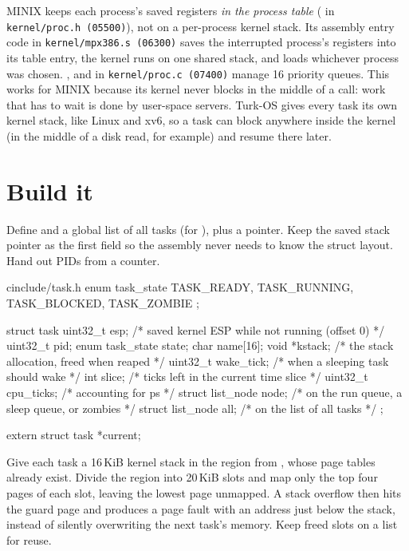 \documentclass[11pt,a4paper]{article}
\begin{document}
\begin{minixbox}
MINIX keeps each process's saved registers \emph{in the process table} ( in \texttt{kernel/proc.h
(05500)}), not on a per-process kernel stack. Its assembly entry code in \texttt{kernel/mpx386.s (06300)} saves the
interrupted process's registers into its table entry, the kernel runs on one shared stack, and  loads
whichever process was chosen. ,  and  in \texttt{kernel/proc.c (07400)}
manage 16 priority queues. This works for MINIX because its kernel never blocks in the middle of a call: work that has
to wait is done by user-space servers. Turk-OS gives every task its own kernel stack, like Linux and xv6, so a task can
block anywhere inside the kernel (in the middle of a disk read, for example) and resume there later.
\end{minixbox}

\section{Build it}

Define  and a global list of all tasks (for ), plus a  pointer. Keep the
saved stack pointer as the first field so the assembly never needs to know the struct layout. Hand out PIDs from a
counter.

\begin{lst}{c}{include/task.h}
enum task_state { TASK_READY, TASK_RUNNING, TASK_BLOCKED, TASK_ZOMBIE };

struct task {
    uint32_t         esp;          /* saved kernel ESP while not running (offset 0)  */
    uint32_t         pid;
    enum task_state  state;
    char             name[16];
    void            *kstack;       /* the stack allocation, freed when reaped        */
    uint32_t         wake_tick;    /* when a sleeping task should wake               */
    int              slice;        /* ticks left in the current time slice           */
    uint32_t         cpu_ticks;    /* accounting for ps                              */
    struct list_node node;         /* on the run queue, a sleep queue, or zombies    */
    struct list_node all;          /* on the list of all tasks                       */
};

extern struct task *current;
\end{lst}

Give each task a 16\,KiB kernel stack in the region from , whose page tables already exist. Divide
the region into 20\,KiB slots and map only the top four pages of each slot, leaving the lowest page unmapped. A stack
overflow then hits the guard page and produces a page fault with an address just below the stack, instead of silently
overwriting the next task's memory. Keep freed slots on a list for reuse.
\end{document}
